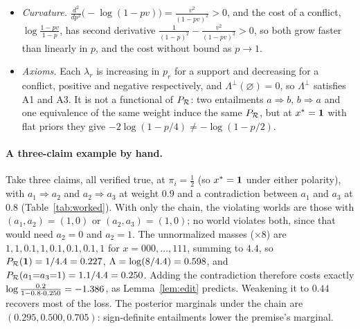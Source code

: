 \begin{itemize}[leftmargin=1.2em,itemsep=1pt,topsep=2pt]
  sets partition a third's score as that relation does (two entailments against one equivalence,
  a contradiction and a co-necessity against one exclusion).
\item \emph{Curvature.} $\frac{d^2}{dp^2}\bigl(-\log(1-pv)\bigr)=\frac{v^2}{(1-pv)^2}>0$, and the
  cost of a conflict, $\log\frac{1-pv}{1-p}$, has second derivative
  $\frac{1}{(1-p)^2}-\frac{v^2}{(1-pv)^2}>0$, so both grow faster than linearly in $p$, and the cost
  without bound as $p\to1$.
\item \emph{Axioms.} Each $\lambda_r$ is increasing in $p_r$ for a support and decreasing for a
  conflict, positive and negative respectively, and $\Lambda^{\perp}(\varnothing)=0$, so
  $\Lambda^{\perp}$ satisfies A1 and A3. It is not a functional of $P_{\mathcal{R}}$: two entailments
  $a\Rightarrow b$, $b\Rightarrow a$ and one equivalence of the same weight induce the same $P_{\mathcal{R}}$,
  but at $x^{\ast}=\mathbf{1}$ with flat priors they give $-2\log(1-p/4)\neq-\log(1-p/2)$.
\end{itemize}

\paragraph{A three-claim example by hand.} Take three claims, all verified true, at $\pi_i=\frac12$ (so $x^{\ast}=\mathbf{1}$
under either polarity), with $a_1\Rightarrow a_2$ and $a_2\Rightarrow a_3$ at weight $0.9$ and a
contradiction between $a_1$ and $a_3$ at $0.8$ (Table~\ref{tab:worked}). With only the chain, the
violating worlds are those with $(a_1,a_2)=(1,0)$ or $(a_2,a_3)=(1,0)$; no world violates both,
since that would need $a_2=0$ and $a_2=1$. The unnormalized masses ($\times8$) are
$1,1,0.1,1,0.1,0.1,0.1,1$ for $x=000,\dots,111$, summing to $4.4$, so
$P_{\mathcal{R}}(\mathbf{1})=1/4.4=0.227$, $\Lambda=\log(8/4.4)=0.598$, and
$P_{\mathcal{R}}(a_1{=}a_3{=}1)=1.1/4.4=0.250$. Adding the contradiction therefore costs exactly
$\log\frac{0.2}{1-0.8\cdot0.250}=-1.386$, as Lemma~\ref{lem:edit} predicts.
Weakening it to $0.44$ recovers most of the loss. The posterior marginals under the chain
are $(0.295,0.500,0.705)$: sign-definite entailments lower the premise's marginal.

